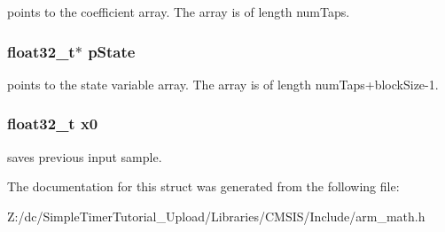 points to the coefficient array. The array is of length num\-Taps. \hypertarget{structarm__lms__norm__instance__f32_a335c87e6fdc4b96601d95a5de8b9c463}{
\subsubsection[{p\-State}]{\setlength{\rightskip}{0pt plus 5cm}float32\-\_\-t$\ast$ p\-State}}\label{structarm__lms__norm__instance__f32_a335c87e6fdc4b96601d95a5de8b9c463}
points to the state variable array. The array is of length num\-Taps+block\-Size-\/1. \hypertarget{structarm__lms__norm__instance__f32_ab56b6f83c5b324c3ef620474b6e5a6e1}{
\subsubsection[{x0}]{\setlength{\rightskip}{0pt plus 5cm}float32\-\_\-t x0}}\label{structarm__lms__norm__instance__f32_ab56b6f83c5b324c3ef620474b6e5a6e1}
saves previous input sample. 

The documentation for this struct was generated from the following file\-:\begin{DoxyCompactItemize}
\item 
Z\-:/dc/\-Simple\-Timer\-Tutorial\-\_\-\-Upload/\-Libraries/\-C\-M\-S\-I\-S/\-Include/arm\-\_\-math.\-h\end{DoxyCompactItemize}
